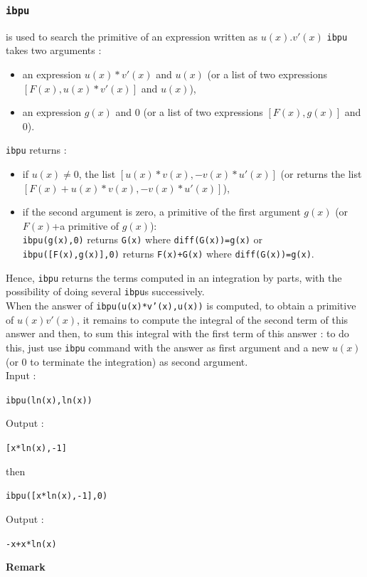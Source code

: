 \documentclass[a4paper,11pt]{book}
\begin{document}
\subsubsection{\tt ibpu}
 is used to search the primitive of an expression written 
as $u(x).v'(x)$
{\tt ibpu} takes two arguments  : 
\begin{itemize}
\item an expression $u(x)*v'(x)$ and $u(x)$ (or a list of two expressions 
$[F(x), u(x)*v'(x)]$ and $u(x)$),
\item an expression $g(x)$ and $0$ (or a list of two expressions $[F(x), g(x)]$ 
and $0$).
\end{itemize}
{\tt ibpu} returns :
\begin{itemize}
\item if $u(x) \neq 0$, the list $[u(x)*v(x),-v(x)*u'(x)]$ 
(or returns the list $[F(x)+u(x)*v(x),-v(x)*u'(x)]$),
\item if the second  argument is zero, a primitive of the first argument $g(x)$
(or $F(x)$+a primitive of $g(x)$):\\ 
{\tt ibpu(g(x),0)} returns {\tt G(x)} where {\tt diff(G(x))=g(x)} or\\
 {\tt ibpu([F(x),g(x)],0)} returns {\tt F(x)+G(x)} where {\tt diff(G(x))=g(x)}.
\end{itemize}
Hence, {\tt ibpu} returns the terms computed in an integration by parts, 
with the possibility of doing several {\tt ibpu}s successively.\\
When the answer of {\tt ibpu(u(x)*v'(x),u(x))} is computed, to obtain a 
primitive of $u(x) v'(x)$, it remains to 
compute the integral of the second term of this answer and then, to sum this 
integral with the first term of this answer : to do this, just use  
{\tt ibpu} command with the answer as first argument and  
a new $u(x)$ (or $0$ to terminate the integration) as second argument.\\ 
Input :
\begin{center}{\tt ibpu(ln(x),ln(x)) }\end{center}
Output :
\begin{center}{\tt [x*ln(x),-1]}\end{center}
then
\begin{center}{\tt ibpu([x*ln(x),-1],0) }\end{center}
Output :
\begin{center}{\tt -x+x*ln(x)}\end{center}
{\bf Remark}\\
\end{document}
